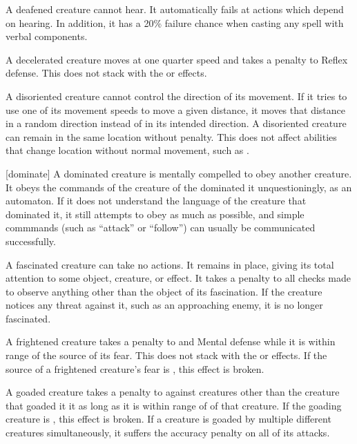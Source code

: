  A deafened creature cannot hear. It automatically fails at actions which depend on hearing. In addition, it has a 20\% failure chance when casting any spell with verbal components.

 A decelerated creature moves at one quarter speed and takes a  penalty to Reflex defense.
This does not stack with the \slowed or \immobilized effects.

 A disoriented creature cannot control the direction of its movement.
If it tries to use one of its movement speeds to move a given distance, it moves that distance in a random direction instead of in its intended direction.
A disoriented creature can remain in the same location without penalty.
This does not affect abilities that change location without normal movement, such as .

[dominate] A dominated creature is mentally compelled to obey another creature.
It obeys the commands of the creature of the dominated it unquestioningly, as an automaton.
If it does not understand the language of the creature that dominated it, it still attempts to obey as much as possible, and simple commmands (such as ``attack'' or ``follow'') can usually be communicated successfully.

 A fascinated creature can take no actions. It remains in place, giving its total attention to some object, creature, or effect. It takes a  penalty to all checks made to observe anything other than the object of its fascination.
If the creature notices any threat against it, such as an approaching enemy, it is no longer fascinated.

 A frightened creature takes a  penalty to  and Mental defense while it is within \rngmed range of the source of its fear.
This does not stack with the \shaken or \panicked effects.
If the source of a frightened creature's fear is , this effect is broken.

 A goaded creature takes a  penalty to  against creatures other than the creature that goaded it it as long as it is within \rngmed range of of that creature.
If the goading creature is , this effect is broken.
If a creature is goaded by multiple different creatures simultaneously, it suffers the accuracy penalty on all of its attacks.

